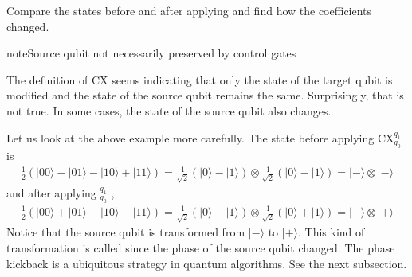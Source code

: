 \documentclass[letterpaper,10pt,english]{jupyterBook}
\begin{document}
\sphinxAtStartPar
Compare the states before and after applying  and find how the coefficients changed.

\begin{sphinxadmonition}{note}{Source qubit not necessarily preserved by control gates}

\sphinxAtStartPar
The definition of CX seems indicating that only the state of the target qubit is modified and the state of the source qubit remains the same.  Surprisingly, that is not true.  In some cases, the state of the source qubit also changes.

\sphinxAtStartPar
Let us look at the above example more carefully.  The state before applying CX\(_{q_0}^{q_1}\) is
\begin{equation*}
\begin{split}
\frac{1}{2}\left(|00\rangle - |01\rangle - |10\rangle + |11\rangle\right) =
\frac{1}{\sqrt{2}}\left(|0\rangle - |1\rangle\right) \otimes \frac{1}{\sqrt{2}}\left(|0\rangle - |1\rangle\right) = |-\rangle\otimes |-\rangle
\end{split}
\end{equation*}
\sphinxAtStartPar
and after applying \(_{q_0}^{q_1}\) ,
\begin{equation*}
\begin{split}
\frac{1}{2}\left(|00\rangle + |01\rangle - |10\rangle - |11\rangle\right) =
\frac{1}{\sqrt{2}}\left(|0\rangle - |1\rangle\right) \otimes \frac{1}{\sqrt{2}}\left(|0\rangle + |1\rangle\right) = |-\rangle\otimes |+\rangle
\end{split}
\end{equation*}
\sphinxAtStartPar
Notice that the source qubit is transformed from \(|-\rangle\) to \(|+\rangle\).  This kind of transformation is called  since the phase of the source qubit changed.  The phase kickback is a ubiquitous strategy in quantum algorithms.  See the next subsection.
\end{sphinxadmonition}
\end{document}
